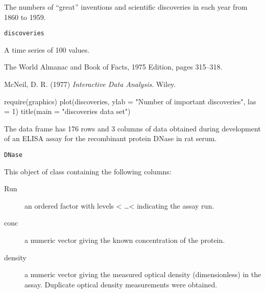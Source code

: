 %
\begin{Description}\relax
The numbers of ``great'' inventions and scientific
discoveries in each year from 1860 to 1959.
\end{Description}
%
\begin{Usage}
\begin{verbatim}
discoveries
\end{verbatim}
\end{Usage}
%
\begin{Format}
A time series of 100 values.
\end{Format}
%
\begin{Source}\relax
The World Almanac and Book of Facts, 1975 Edition, pages 315--318.
\end{Source}
%
\begin{References}\relax
McNeil, D. R. (1977)
\emph{Interactive Data Analysis}.
Wiley.
\end{References}
%
\begin{Examples}
\begin{ExampleCode}
require(graphics)
plot(discoveries, ylab = "Number of important discoveries",
     las = 1)
title(main = "discoveries data set")
\end{ExampleCode}
\end{Examples}
%
\begin{Description}\relax
The  data frame has 176 rows and 3 columns of data
obtained during development of an ELISA assay for the recombinant
protein DNase in rat serum.
\end{Description}
%
\begin{Usage}
\begin{verbatim}
DNase
\end{verbatim}
\end{Usage}
%
\begin{Format}
This object of class  containing the following columns:
\begin{description}

\item[Run] 
an ordered factor with levels  < \dots < 
indicating the assay run.

\item[conc] 
a numeric vector giving the known concentration of the
protein. 

\item[density] 
a numeric vector giving the measured optical density
(dimensionless) in the assay.  Duplicate optical density
measurements were obtained. 


\end{description}

\end{Format}
